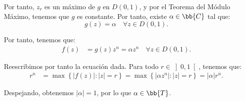 \documentclass[12pt]{article}
\begin{document}
\begin{ejercicio}[2.5 puntos]
        Por tanto, $z_r$ es un máximo de $g$ en $D(0, 1)$, y por el Teorema del Módulo Máximo, tenemos que $g$ es constante. Por tanto, existe $\alpha\in \bb{C}$ tal que:
        \begin{equation*}
            g(z) = \alpha \quad \forall z\in D(0, 1).
        \end{equation*}

        Por tanto, tenemos que:
        \begin{align*}
            f(z) &= g(z)z^n = \alpha z^n \quad \forall z\in D(0, 1).
        \end{align*}

        Reescribimos por tanto la ecuación dada. Para todo $r\in \left]0, 1\right[$, tenemos que:
        \begin{align*}
            r^n &= \max\left\{ |f(z)| : |z| = r \right\} = \max\left\{ |\alpha z^n| : |z| = r \right\}
            = |\alpha| r^n.
        \end{align*}

        Despejando, obtenemos $|\alpha| = 1$, por lo que $\alpha \in \bb{T}$.
    \end{ejercicio}
\end{document}
